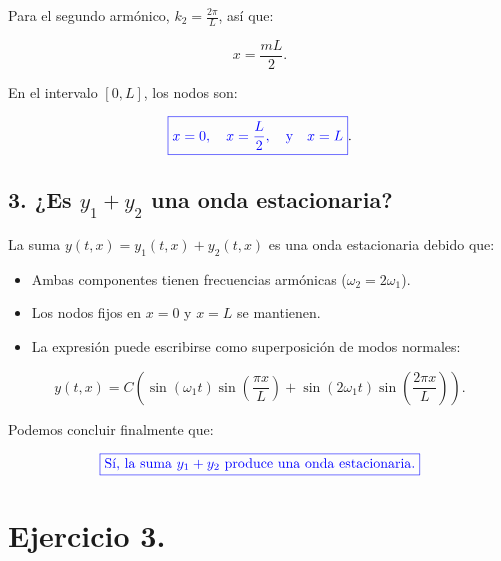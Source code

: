 \documentclass[a4paper,12pt]{article} %
\begin{document}
\begin{justify}
    Para el segundo armónico, \( k_2 = \frac{2\pi}{L} \), así que:
\end{justify}

\[ x = \frac{m L}{2}. \]

\begin{justify}
    En el intervalo \( [0, L] \), los nodos son:
\end{justify}


\[ \textcolor{blue}{\boxed{x = 0, \quad x = \frac{L}{2}, \quad \text{y} \quad x = L}}. \]

\vspace{\baselineskip}

\subsection{3. ¿Es \( y_1 + y_2 \) una onda estacionaria?}

\vspace{\baselineskip}

\begin{justify}
    La suma \( y(t, x) = y_1(t, x) + y_2(t, x) \) es una onda estacionaria debido que:
\end{justify}


\begin{itemize}
    \item Ambas componentes tienen frecuencias armónicas (\( \omega_2 = 2\omega_1 \)).
    \item Los nodos fijos en \( x = 0 \) y \( x = L \) se mantienen.
    \item La expresión puede escribirse como superposición de modos normales:
\end{itemize}

\[ y(t, x) = C \left( \sin(\omega_1 t) \sin\left(\frac{\pi x}{L}\right) + \sin(2\omega_1 t) \sin\left(\frac{2\pi x}{L}\right) \right).\]

\begin{justify}
    Podemos concluir finalmente que:
\end{justify}

\[ \textcolor{blue}{\boxed{\text{Sí, la suma } y_1 + y_2 \text{ produce una onda estacionaria.}}} \]



\section{Ejercicio 3.}
\end{document}
